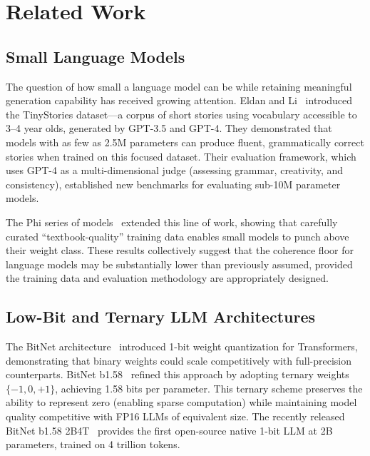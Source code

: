 \section{Related Work}
\label{sec:related}

\subsection{Small Language Models}

The question of how small a language model can be while retaining meaningful
generation capability has received growing attention. Eldan and
Li~\cite{eldan2023tinystories} introduced the TinyStories dataset---a
corpus of short stories using vocabulary accessible to 3--4 year olds,
generated by GPT-3.5 and GPT-4. They demonstrated that models with as few
as 2.5M parameters can produce fluent, grammatically correct stories when
trained on this focused dataset. Their evaluation framework, which uses
GPT-4 as a multi-dimensional judge (assessing grammar, creativity, and
consistency), established new benchmarks for evaluating sub-10M parameter models.

The Phi series of models~\cite{gunasekar2023textbooks} extended this line of
work, showing that carefully curated ``textbook-quality'' training data enables
small models to punch above their weight class. These results collectively
suggest that the coherence floor for language models may be substantially lower
than previously assumed, provided the training data and evaluation methodology
are appropriately designed.

\subsection{Low-Bit and Ternary LLM Architectures}

The BitNet architecture~\cite{wang2023bitnet} introduced 1-bit weight
quantization for Transformers, demonstrating that binary weights could scale
competitively with full-precision counterparts. BitNet
b1.58~\cite{ma2024bitnet} refined this approach by adopting ternary weights
$\{-1, 0, +1\}$, achieving 1.58 bits per parameter. This ternary scheme
preserves the ability to represent zero (enabling sparse computation) while
maintaining model quality competitive with FP16 LLMs of equivalent size.
The recently released BitNet b1.58 2B4T~\cite{bitnet2b4t2025} provides the
first open-source native 1-bit LLM at 2B parameters, trained on 4 trillion
tokens.

